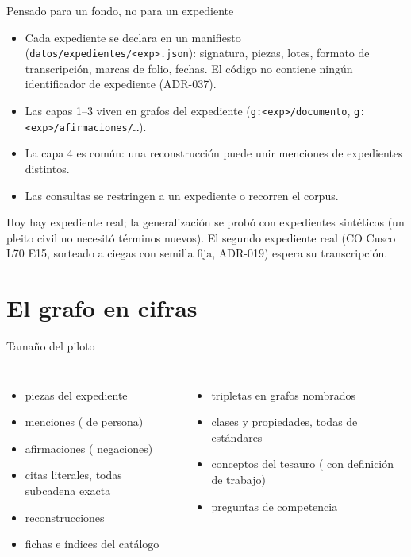 \documentclass[aspectratio=169,10pt]{beamer}
\newcommand{\ttt}[1]{\texttt{\small #1}}
\newcommand{\cifra}[1]{\textbf{\alert{#1}}}
\begin{document}
\begin{frame}{Pensado para un fondo, no para un expediente}
\begin{itemize}
\item Cada expediente se declara en un \alert{manifiesto} (\ttt{datos/expedientes/<exp>.json}): signatura, piezas, lotes,
      formato de transcripción, marcas de folio, fechas. El código no contiene ningún identificador de expediente
      (ADR-037).
\item Las capas 1--3 viven en grafos del expediente (\ttt{g:<exp>/documento}, \ttt{g:<exp>/afirmaciones/…}).
\item La capa 4 es común: una reconstrucción puede unir menciones de \alert{expedientes distintos}.
\item Las consultas se restringen a un expediente o recorren el corpus.
\end{itemize}
\medskip
Hoy hay \cifra{\cifraExpedientes} expediente real; la generalización se probó con expedientes sintéticos (un pleito
civil no necesitó términos nuevos). El segundo expediente real (CO Cusco L70 E15, sorteado a ciegas con semilla fija,
ADR-019) espera su transcripción.
\end{frame}

\section{El grafo en cifras}

\begin{frame}{Tamaño del piloto}
\begin{columns}[T]
\begin{itemize}
\item \cifra{\cifraPiezas} piezas del expediente
\item \cifra{\cifraMenciones} menciones (\cifra{\cifraPersonas} de persona)
\item \cifra{\cifraAfirmaciones} afirmaciones (\cifra{\cifraNegaciones} negaciones)
\item \cifra{\cifraCitas} citas literales, todas subcadena exacta
\item \cifra{\cifraReconstrucciones} reconstrucciones
\item \cifra{\cifraCatalogoRegistros} fichas e índices del catálogo
\end{itemize}
\begin{itemize}
\item \cifra{\cifraTripletas} tripletas en \cifra{\cifraGrafos} grafos nombrados
\item \cifra{\cifraClases} clases y \cifra{\cifraPropiedades} propiedades, todas de estándares
\item \cifra{\cifraConceptos} conceptos del tesauro (\cifra{\cifraDefinicionesDeTrabajo} con definición de trabajo)
\item \cifra{\cifraPreguntas} preguntas de competencia
\end{itemize}
\end{columns}
\end{frame}
\end{document}
